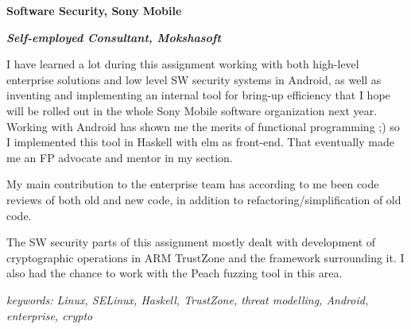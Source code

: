 \item[2012-2016] \textbf{Software Security, Sony Mobile}

\textit{\textbf{Self-employed Consultant, Mokshasoft}}

I have learned a lot during this assignment working with both high-level enterprise solutions and low level SW security systems in Android, as well as inventing and implementing an internal tool for bring-up efficiency that I hope will be rolled out in the whole Sony Mobile software organization next year. Working with Android has shown me the merits of functional programming ;) so I implemented this tool in Haskell with elm as front-end. That eventually made me an FP advocate and mentor in my section.

My main contribution to the enterprise team has according to me been code reviews of both old and new code, in addition to refactoring/simplification of old code.

The SW security parts of this assignment mostly dealt with development of cryptographic operations in ARM TrustZone and the framework surrounding it. I also had the chance to work with the Peach fuzzing tool in this area.

\textit{keywords: Linux, SELinux, Haskell, TrustZone, threat modelling, Android, enterprise, crypto}
